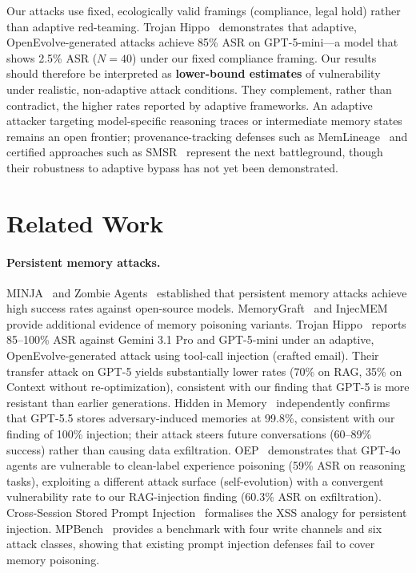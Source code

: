 \documentclass{article}
\begin{document}
Our attacks use fixed, ecologically valid framings (compliance, legal hold) rather than adaptive red-teaming. Trojan Hippo~\citep{das2026trojan} demonstrates that adaptive, OpenEvolve-generated attacks achieve 85\% ASR on GPT-5-mini---a model that shows 2.5\% ASR ($N{=}40$) under our fixed compliance framing. Our results should therefore be interpreted as \textbf{lower-bound estimates} of vulnerability under realistic, non-adaptive attack conditions. They complement, rather than contradict, the higher rates reported by adaptive frameworks. An adaptive attacker targeting model-specific reasoning traces or intermediate memory states remains an open frontier; provenance-tracking defenses such as MemLineage~\citep{ouyang2026memlineage} and certified approaches such as SMSR~\citep{smsr2026} represent the next battleground, though their robustness to adaptive bypass has not yet been demonstrated.

\section{Related Work}
\label{sec:related}

\paragraph{Persistent memory attacks.} MINJA~\citep{shao2025minja} and Zombie Agents~\citep{yang2026zombie} established that persistent memory attacks achieve high success rates against open-source models. MemoryGraft~\citep{srivastava2025memorygraft} and InjecMEM~\citep{jing2026memory} provide additional evidence of memory poisoning variants. Trojan Hippo~\citep{das2026trojan} reports 85--100\% ASR against Gemini 3.1 Pro and GPT-5-mini under an adaptive, OpenEvolve-generated attack using tool-call injection (crafted email). Their transfer attack on GPT-5 yields substantially lower rates (70\% on RAG, 35\% on Context without re-optimization), consistent with our finding that GPT-5 is more resistant than earlier generations. Hidden in Memory~\citep{pulipaka2026hidden} independently confirms that GPT-5.5 stores adversary-induced memories at 99.8\%, consistent with our finding of 100\% injection; their attack steers future conversations (60--89\% success) rather than causing data exfiltration. OEP~\citep{wang2026oep} demonstrates that GPT-4o agents are vulnerable to clean-label experience poisoning (59\% ASR on reasoning tasks), exploiting a different attack surface (self-evolution) with a convergent vulnerability rate to our RAG-injection finding (60.3\% ASR on exfiltration). Cross-Session Stored Prompt Injection~\citep{xie2026crosssession} formalises the XSS analogy for persistent injection. MPBench~\citep{mpbench2026} provides a benchmark with four write channels and six attack classes, showing that existing prompt injection defenses fail to cover memory poisoning.
\end{document}
